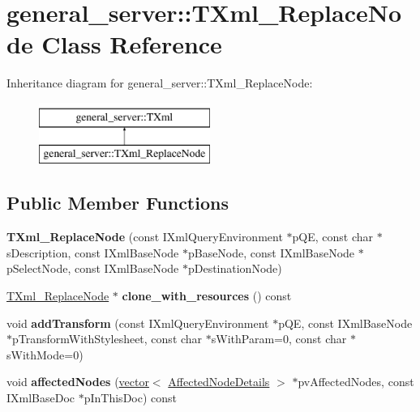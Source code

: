 \hypertarget{classgeneral__server_1_1TXml__ReplaceNode}{\section{general\-\_\-server\-:\-:\-T\-Xml\-\_\-\-Replace\-Node \-Class \-Reference}
\label{classgeneral__server_1_1TXml__ReplaceNode}
}
\-Inheritance diagram for general\-\_\-server\-:\-:\-T\-Xml\-\_\-\-Replace\-Node\-:\begin{figure}[H]
\begin{center}
\leavevmode
\includegraphics[height=2.000000cm]{classgeneral__server_1_1TXml__ReplaceNode}
\end{center}
\end{figure}
\subsection*{\-Public \-Member \-Functions}
\begin{DoxyCompactItemize}
\item 
\hypertarget{classgeneral__server_1_1TXml__ReplaceNode_a7d7b8ffb6ae77fd0328dba46137e9abf}{{\bfseries \-T\-Xml\-\_\-\-Replace\-Node} (const \-I\-Xml\-Query\-Environment $\ast$p\-Q\-E, const char $\ast$s\-Description, const \-I\-Xml\-Base\-Node $\ast$p\-Base\-Node, const \-I\-Xml\-Base\-Node $\ast$p\-Select\-Node, const \-I\-Xml\-Base\-Node $\ast$p\-Destination\-Node)}\label{classgeneral__server_1_1TXml__ReplaceNode_a7d7b8ffb6ae77fd0328dba46137e9abf}

\item 
\hypertarget{classgeneral__server_1_1TXml__ReplaceNode_a050d475cfa9d84bd5b5e997f8b63671d}{\hyperlink{classgeneral__server_1_1TXml__ReplaceNode}{\-T\-Xml\-\_\-\-Replace\-Node} $\ast$ {\bfseries clone\-\_\-with\-\_\-resources} () const }\label{classgeneral__server_1_1TXml__ReplaceNode_a050d475cfa9d84bd5b5e997f8b63671d}

\item 
\hypertarget{classgeneral__server_1_1TXml__ReplaceNode_ae35c9e987b219eb0ab0e7e032ec286c6}{void {\bfseries add\-Transform} (const \-I\-Xml\-Query\-Environment $\ast$p\-Q\-E, const \-I\-Xml\-Base\-Node $\ast$p\-Transform\-With\-Stylesheet, const char $\ast$s\-With\-Param=0, const char $\ast$s\-With\-Mode=0)}\label{classgeneral__server_1_1TXml__ReplaceNode_ae35c9e987b219eb0ab0e7e032ec286c6}

\item 
\hypertarget{classgeneral__server_1_1TXml__ReplaceNode_a90f7b68e10560efba41be61454500838}{void {\bfseries affected\-Nodes} (\hyperlink{classvector}{vector}$<$ \hyperlink{structgeneral__server_1_1TXml_1_1AffectedNodeDetails}{\-Affected\-Node\-Details} $>$ $\ast$pv\-Affected\-Nodes, const \-I\-Xml\-Base\-Doc $\ast$p\-In\-This\-Doc) const }\label{classgeneral__server_1_1TXml__ReplaceNode_a90f7b68e10560efba41be61454500838}

\end{DoxyCompactItemize}
